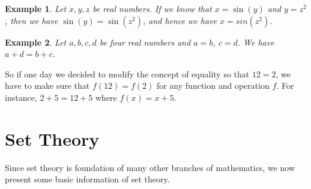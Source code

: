 \documentclass[a4paper,oneside]{book}
\newtheorem{example}{Example}[section]
\begin{document}
			\begin{example}
				Let $x,y,z$ be real numbers. If we know that $x=\sin(y)$ and $y=z^2$, then we have $\sin(y)=\sin(z^2)$, and hence we have $x=sin(z^2)$.
			\end{example}
			\begin{example}
				Let $a,b,c,d$ be four real numbers and $a=b$, $c=d$. We have $a+d=b+c$.
			\end{example}
			So if one day we decided to modify the concept of equality so that $12=2$, we have to make sure that $f(12)=f(2)$ for any function and operation $f$. For instance, $2+5=12+5$ where $f(x)=x+5$.
	\chapter{Set Theory}
	Since set theory is foundation of many other branches of mathematics, we now present some basic information of set theory.
\end{document}
